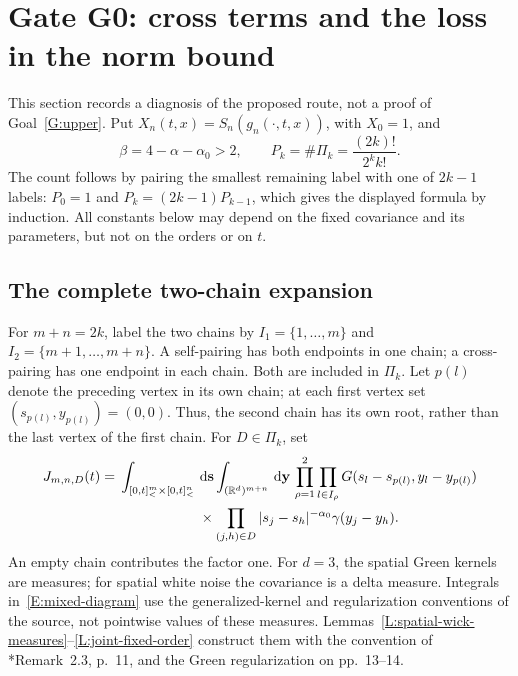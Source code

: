 \documentclass[12pt]{article}
\numberwithin{equation}{section}
\theoremstyle{definition}
\newcommand{\R}{\mathbb{R}}
\newcommand{\ud}{\,\mathrm{d}}
\begin{document}
\section{Gate G0: cross terms and the loss in the norm bound}\label{S:G0}

This section records a diagnosis of the proposed route, not a proof of
Goal~\ref{G:upper}. Put $X_n(t,x)=S_n(g_n(\cdot,t,x))$, with $X_0=1$, and
\[
  \beta=4-\alpha-\alpha_0>2,\qquad
  P_k=\#\Pi_k=\frac{(2k)!}{2^k k!}.
\]
The count follows by pairing the smallest remaining label with one of
$2k-1$ labels: $P_0=1$ and $P_k=(2k-1)P_{k-1}$, which gives the displayed
formula by induction. All constants below may depend on the fixed covariance and its parameters,
but not on the orders or on $t$.

\subsection{The complete two-chain expansion}

For $m+n=2k$, label the two chains by
$I_1=\{1,\ldots,m\}$ and $I_2=\{m+1,\ldots,m+n\}$.
A self-pairing has both endpoints in one chain; a cross-pairing has one
endpoint in each chain. Both are included in $\Pi_k$.
Let $p(l)$ denote the preceding vertex in its own chain; at each first
vertex set $(s_{p(l)},y_{p(l)})=(0,0)$. Thus, the second chain has its own
root, rather than the last vertex of the first chain. For $D\in\Pi_k$, set
\begin{equation}\label{E:mixed-diagram}
  \begin{split}
    J_{m,n,D}(t)
    ={}&\int_{[0,t]^m_<\times[0,t]^n_<}\ud\mathbf s
    \int_{(\R^d)^{m+n}}\ud\mathbf y\,
    \prod_{\rho=1}^2\prod_{l\in I_\rho}
    G(s_l-s_{p(l)},y_l-y_{p(l)})\\
    &\hspace{20mm}\times
    \prod_{(j,h)\in D}|s_j-s_h|^{-\alpha_0}\gamma(y_j-y_h).
  \end{split}
\end{equation}
An empty chain contributes the factor one. For $d=3$, the spatial Green
kernels are measures; for spatial white noise the covariance is a delta
measure. Integrals in~\eqref{E:mixed-diagram} use the generalized-kernel
and regularization conventions of the source, not pointwise values of
these measures. Lemmas~\ref{L:spatial-wick-measures}--\ref{L:joint-fixed-order}
construct them with the convention of
\cite{chen:author2026:time-dependency}*{Remark~2.3, p.~11,
and the Green regularization on pp.~13--14}.
\end{document}
